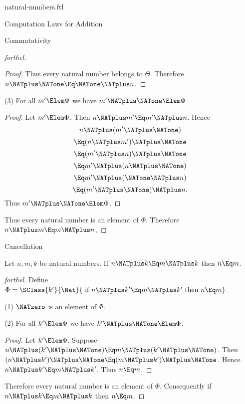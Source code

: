 \documentclass{stex}
\begin{document}
\begin{smodule}{natural-numbers.ftl}
\begin{sfragment}{Computation Laws for Addition}
\begin{sfragment}{Commutativity}
\begin{proof}[forthel]
\begin{proof}
        Thus every natural number belongs to $\Theta$.
        Therefore $n \NATplus \NATone \Eq \NATone \NATplus n$.
      \end{proof}

      (3) For all $m' \Elem \Phi$ we have $m' \NATplus \NATone \Elem \Phi$.
      \begin{proof}
        Let $m' \Elem \Phi$.
        Then $n \NATplus m' \Eq m' \NATplus n$.
        Hence
        \[  n \NATplus (m'  \NATplus \NATone)       \]
        \[    \Eq (n \NATplus m') \NATplus \NATone    \]
        \[    \Eq (m' \NATplus n) \NATplus \NATone    \]
        \[    \Eq m' \NATplus (n \NATplus \NATone)    \]
        \[    \Eq m' \NATplus (\NATone \NATplus n)    \]
        \[    \Eq (m' \NATplus \NATone) \NATplus n.   \]
        Thus $m' \NATplus \NATone \Elem \Phi$.
      \end{proof}

      Thus every natural number is an element of $\Phi$.
      Therefore $n \NATplus m \Eq m \NATplus n$.
    \end{proof}
  \end{sfragment}

  \begin{sfragment}{Cancellation}
    \begin{proposition}[forthel,id=ARITHMETIC_03_3137702874578944]
      Let $n, m, k$ be natural numbers.
      If $n \NATplus k \Eq m \NATplus k$ then $n \Eq m$.
    \end{proposition}
    \begin{proof}[forthel]
      Define $\Phi = \SClass{k'}{\Nat}{\text{ if }n \NATplus k' \Eq m \NATplus k'\text{ then }n \Eq m}$.

      (1) $\NATzero$ is an element of $\Phi$.

      (2) For all $k' \Elem \Phi$ we have $k' \NATplus \NATone \Elem \Phi$.
      \begin{proof}
        Let $k' \Elem \Phi$.
        Suppose $n \NATplus (k' \NATplus \NATone) \Eq m \NATplus (k' \NATplus \NATone)$.
        Then $(n \NATplus k') \NATplus \NATone \Eq (m \NATplus k') \NATplus \NATone$.
        Hence $n \NATplus k' \Eq m \NATplus k'$.
        Thus $n \Eq m$.
      \end{proof}

      Therefore every natural number is an element of $\Phi$.
      Consequently if $n \NATplus k \Eq m \NATplus k$ then $n \Eq m$.
    \end{proof}


\end{sfragment}
\end{sfragment}
\end{smodule}
\end{document}
